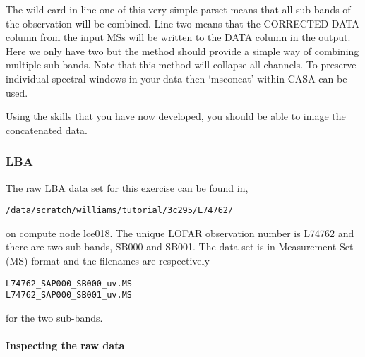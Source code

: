 The wild card in line one of this very simple parset means that all sub-bands of the observation will be combined. Line two means that the CORRECTED DATA column from the input MSs will be written to the DATA column in the output. Here we only have two but the method should provide a simple way of combining multiple sub-bands.  Note that this  method will collapse all channels.  To preserve individual spectral windows in your data then `msconcat' within CASA can be used.

Using the skills that you have now developed, you should be able to image the concatenated data.

% 
% 



\subsubsection{LBA}
The raw LBA data set for this exercise can be found in,
\begin{verbatim}
/data/scratch/williams/tutorial/3c295/L74762/
\end{verbatim}
on compute node lce018. The unique LOFAR observation number is
L74762
and there are two sub-bands,
SB000
and 
SB001.
The data set is in Measurement Set (MS) format and the filenames are respectively
\begin{verbatim}
L74762_SAP000_SB000_uv.MS
L74762_SAP000_SB001_uv.MS
\end{verbatim}
for the two sub-bands.

\paragraph{Inspecting the raw data}\mbox{}\\

